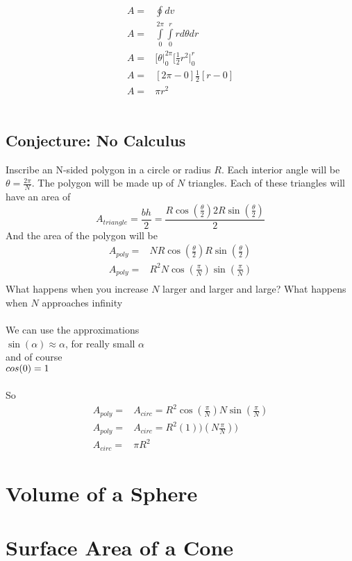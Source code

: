 \documentclass[11pt]{book}
\begin{document}
\begin{align*}
A =& \oint dv \\
A =& \int\limits_{0}^{2\pi}\int\limits_{0}^{r} rd\theta dr \\
A =& \bigg[ \theta \bigg|_{0}^{2\pi}\bigg[ \frac{1}{2}r^2 \bigg|_{0}^{r} \\
A =& [2\pi - 0]\frac{1}{2}[r-0] \\
A =& \pi r^2
\end{align*}
\\
\subsection{Conjecture: No Calculus}

Inscribe an N-sided polygon in a circle or radius \(R\).  Each interior angle will be \(\theta =\frac{2\pi}{N}\).  The polygon will be made up of \(N\) triangles.  Each of these triangles will have an area of
\[A_{triangle} = \frac{bh}{2} = \frac{R\cos(\frac{\theta}{2})2R\sin(\frac{\theta}{2})}{2}\]
And the area of the polygon will be
\begin{align*}
A_{poly} =& NR\cos(\frac{\theta}{2})R\sin(\frac{\theta}{2})\\
A_{poly} =& R^2N\cos(\frac{\pi}{N})\sin(\frac{\pi}{N})\\
\end{align*}
What happens when you increase \(N\) larger and larger and large?  What happens when \(N\) approaches infinity\\
\\
We can use the approximations\\
\(\sin(\alpha) \approx \alpha\), for really small \(\alpha\)\\
and of course\\
\(\\cos(0) = 1\)\\
\\
So
\begin{align*}
A_{poly} =& A_{circ} = R^2\cos(\frac{\pi}{N})N\sin(\frac{\pi}{N})\\
A_{poly} =& A_{circ} = R^2(1))(N\frac{\pi}{N}))\\
A_{circ} =& \pi R^2
\end{align*}

\section{Volume of a Sphere}

\section{Surface Area of a Cone}
\end{document}

